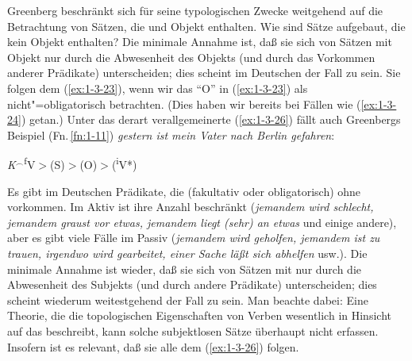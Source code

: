 \documentclass[output=paper]{langsci/langscibook}
\begin{document}
\ssubsubsection{}%
\label{subsubsec:1-3.2.4}

Greenberg beschränkt sich für seine typologischen Zwecke weitgehend auf
die Betrachtung von Sätzen, die  und Objekt enthalten. Wie sind Sätze aufgebaut, die kein Objekt enthalten? Die minimale Annahme ist, daß sie sich von Sätzen
mit Objekt nur durch die Abwesenheit des Objekts (und durch das Vorkommen anderer Prädikate) unterscheiden; dies scheint im Deutschen der Fall zu sein. Sie folgen
dem  (\ref{ex:1-3-23}), wenn wir das "`O"' in (\ref{ex:1-3-23}) als nicht"=obligatorisch betrachten. (Dies
haben wir bereits bei Fällen wie (\ref{ex:1-3-24}) getan.) Unter das derart verallgemeinerte  (\ref{ex:1-3-26}) fällt \zb auch Greenbergs Beispiel (Fn.\,\ref{fn:1-11}) \emph{gestern ist mein Vater nach Berlin gefahren}:
\begin{exe}
\ex\label{ex:1-3-26}
\textit{K}$^{\smallfrown}$\textsuperscript{f}V$>$(S)$>$(O)$>$(\textsuperscript{i}V*)
\end{exe}
Es gibt im Deutschen Prädikate, die (fakultativ oder obligatorisch) ohne 
vorkommen. Im Aktiv ist ihre Anzahl beschränkt (\textit{jemandem wird schlecht, jemandem graust vor etwas, jemandem liegt (sehr) an etwas} und einige andere), 
aber es gibt viele Fälle im Passiv (\textit{jemandem wird geholfen, jemandem ist zu
trauen, irgendwo wird gearbeitet, einer Sache läßt sich abhelfen} usw.). Die
minimale Annahme ist wieder, daß sie sich von Sätzen mit  nur durch die
Abwesenheit des Subjekts (und durch andere Prädikate) unterscheiden; dies scheint
wiederum weitestgehend der Fall zu sein. Man beachte dabei: Eine Theorie, die die
topologischen Eigenschaften von Verben wesentlich in Hinsicht auf das  beschreibt, kann solche subjektlosen Sätze überhaupt nicht erfassen. Insofern ist es relevant, daß sie alle dem  (\ref{ex:1-3-26}) folgen.
\end{document}

